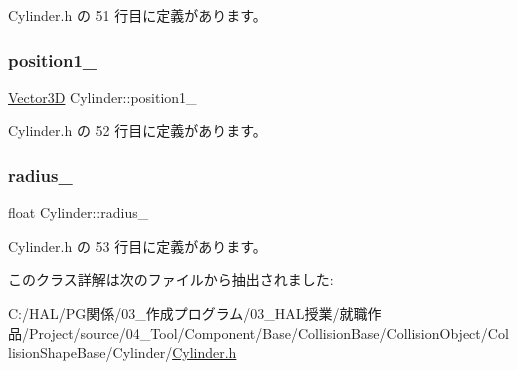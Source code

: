  Cylinder.\+h の 51 行目に定義があります。

\mbox{\label{class_cylinder_ada317510ac188ea639a0f8613c2b554e}} 
\subsubsection{\texorpdfstring{position1\+\_\+}{position1\_}}
{\footnotesize\ttfamily \mbox{\hyperlink{class_vector3_d}{Vector3D}} Cylinder\+::position1\+\_\+}



 Cylinder.\+h の 52 行目に定義があります。

\mbox{\label{class_cylinder_abba752e07b11b7bfd8fcce64a6d9b678}} 
\subsubsection{\texorpdfstring{radius\+\_\+}{radius\_}}
{\footnotesize\ttfamily float Cylinder\+::radius\+\_\+}



 Cylinder.\+h の 53 行目に定義があります。



このクラス詳解は次のファイルから抽出されました\+:\begin{DoxyCompactItemize}
\item 
C\+:/\+H\+A\+L/\+P\+G関係/03\+\_\+作成プログラム/03\+\_\+\+H\+A\+L授業/就職作品/\+Project/source/04\+\_\+\+Tool/\+Component/\+Base/\+Collision\+Base/\+Collision\+Object/\+Collision\+Shape\+Base/\+Cylinder/\mbox{\hyperlink{_cylinder_8h}{Cylinder.\+h}}\end{DoxyCompactItemize}
